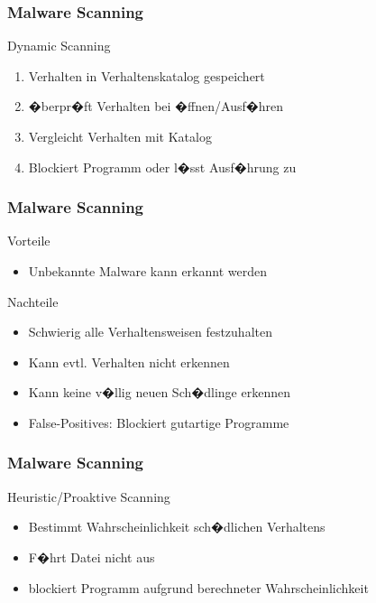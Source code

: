 \documentclass{beamer}
\begin{document}
\begin{frame}
\frametitle{Malware Scanning}
\begin{block}{Dynamic Scanning}
	\begin{enumerate}
		\item Verhalten in Verhaltenskatalog gespeichert
		\item �berpr�ft Verhalten bei �ffnen/Ausf�hren
		\item Vergleicht Verhalten mit Katalog
		\item Blockiert Programm oder l�sst Ausf�hrung zu
	\end{enumerate}
	
\end{block} 
\end{frame}

\begin{frame}
	\frametitle{Malware Scanning}
	\begin{block}{Vorteile}
		\begin{itemize}
			\item Unbekannte Malware kann erkannt werden
		\end{itemize}
	\end{block} 
	\begin{block}{Nachteile}
		\begin{itemize}
			\item Schwierig alle Verhaltensweisen festzuhalten
			\item Kann evtl. Verhalten nicht erkennen
			\item Kann keine v�llig neuen Sch�dlinge erkennen
			\item False-Positives: Blockiert gutartige Programme
		\end{itemize}
	\end{block}
	
\end{frame}


\begin{frame}
\frametitle{Malware Scanning}
\begin{block}{Heuristic/Proaktive Scanning}
	\begin{itemize}
		\item Bestimmt Wahrscheinlichkeit sch�dlichen Verhaltens
		\item F�hrt Datei nicht aus
		\item blockiert Programm aufgrund berechneter Wahrscheinlichkeit
	\end{itemize}
		
\end{block} 

\end{frame}
\end{document}
